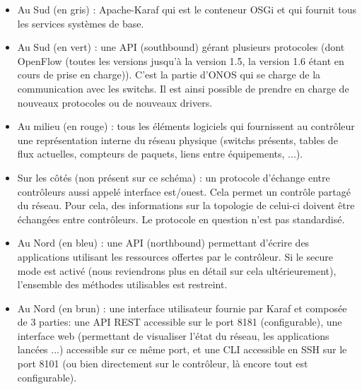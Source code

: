 \begin{itemize}

\item Au Sud (en gris) : Apache-Karaf qui est le conteneur OSGi et qui fournit tous les services systèmes de base.

\item Au Sud (en vert) : une API (southbound) gérant plusieurs protocoles (dont OpenFlow (toutes les versions jusqu’à la version 1.5, la version 1.6 étant en cours de prise en charge)). C’est la partie d’ONOS qui se charge de la communication avec les switchs. Il est ainsi possible de prendre en charge de nouveaux protocoles ou de nouveaux drivers.

\item Au milieu (en rouge) : tous les éléments logiciels qui fournissent au contrôleur une représentation interne du réseau physique (switchs présents, tables de flux actuelles, compteurs de paquets, liens entre équipements, ...).

\item Sur les côtés (non présent sur ce schéma) : un protocole d’échange entre contrôleurs aussi appelé interface est/ouest. Cela permet un contrôle partagé du réseau. Pour cela, des informations sur la topologie de celui-ci doivent être échangées entre contrôleurs. Le protocole en question n'est pas standardisé.

\item Au Nord (en bleu) : une API (northbound) permettant d’écrire des applications utilisant les ressources offertes par le contrôleur. Si le secure mode est activé (nous reviendrons plus en détail sur cela ultérieurement), l’ensemble des méthodes utilisables est restreint. 

\item Au Nord (en brun) : une interface utilisateur fournie par Karaf et composée de 3 parties: une API REST accessible sur le port 8181 (configurable), une interface web (permettant de visualiser l’état du réseau, les applications lancées ...) accessible sur ce même port, et une CLI accessible en SSH sur le port 8101 (ou bien directement sur le contrôleur, là encore tout est configurable).

\end{itemize}